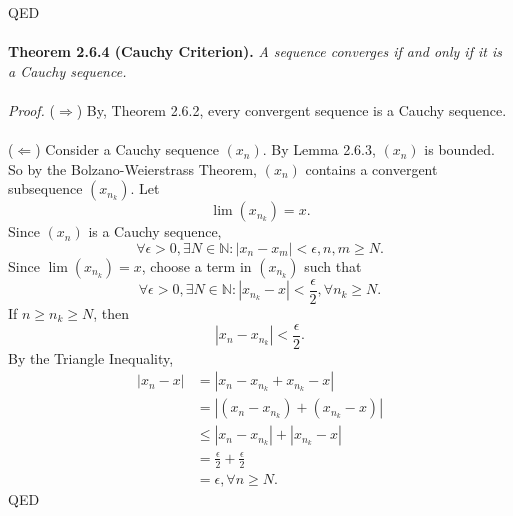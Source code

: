 \documentclass{article}
\begin{document}
            QED\\ \\
            \textbf{Theorem 2.6.4 (Cauchy Criterion).} \textit{A sequence converges if and only if it is a Cauchy sequence.}\\ \\
            \textit{Proof.} ($\Rightarrow$) By, Theorem 2.6.2, every convergent sequence is a Cauchy sequence.\\ \\
            ($\Leftarrow$) Consider a Cauchy sequence $(x_n)$. By Lemma 2.6.3, $(x_n)$ is bounded. So by the Bolzano-Weierstrass Theorem, $(x_n)$ contains a convergent subsequence $(x_{n_k})$. Let
            \begin{equation*}
                \lim(x_{n_k})=x.
            \end{equation*}
            Since $(x_n)$ is a Cauchy sequence, \begin{equation*}
                \forall \epsilon > 0, \exists N \in \mathbb{N}: |x_n - x_m| < \epsilon, n,m \geq N.
            \end{equation*}
            Since $\lim(x_{n_k})=x$, choose a term in $(x_{n_k})$ such that
            \begin{equation*}
                \forall \epsilon>0,\exists N \in \mathbb{N}: |x_{n_k}-x|<\frac{\epsilon}{2}, \forall n_k \geq N.
            \end{equation*}
            If $n \geq n_k \geq N$, then
            \begin{equation*}
                |x_n - x_{n_k}| < \frac{\epsilon}{2}.
            \end{equation*}
            By the Triangle Inequality,
            \begin{align*}
                |x_n-x| & = |x_n - x_{n_k} + x_{n_k} - x| \\
                & = |(x_n - x_{n_k})+(x_{n_k} - x)| \\
                & \leq |x_n - x_{n_k}| + |x_{n_k} - x| \\
                & = \frac{\epsilon}{2} + \frac{\epsilon}{2} \\
                & = \epsilon, \forall n \geq N.
            \end{align*}
            QED
\end{document}
